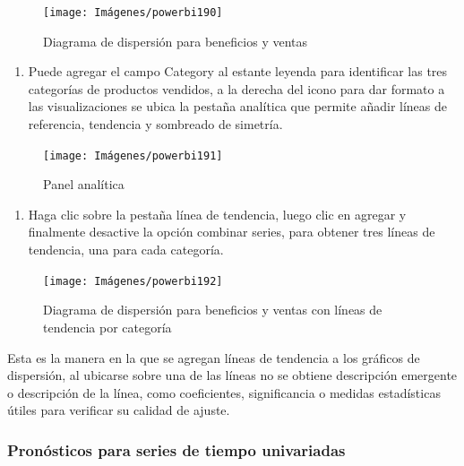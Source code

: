 \documentclass[
]{book}
\providecommand{\tightlist}{%
  \setlength{\itemsep}{0pt}\setlength{\parskip}{0pt}}
\begin{document}
\begin{figure}

{\centering \texttt{[image: Imágenes/powerbi190]} 

}

\caption{Diagrama de dispersión para beneficios y ventas}\label{fig:paso4dispersionpowerbi-fig}
\end{figure}

\begin{enumerate}
\def\labelenumi{\arabic{enumi}.}
\setcounter{enumi}{4}
\tightlist
\item
  Puede agregar el campo Category al estante leyenda para identificar las tres categorías de productos vendidos, a la derecha del icono para dar formato a las visualizaciones se ubica la pestaña analítica que permite añadir líneas de referencia, tendencia y sombreado de simetría.
\end{enumerate}

\begin{figure}

{\centering \texttt{[image: Imágenes/powerbi191]} 

}

\caption{Panel analítica}\label{fig:paso5dispersionpowerbi-fig}
\end{figure}

\begin{enumerate}
\def\labelenumi{\arabic{enumi}.}
\setcounter{enumi}{5}
\tightlist
\item
  Haga clic sobre la pestaña línea de tendencia, luego clic en agregar y finalmente desactive la opción combinar series, para obtener tres líneas de tendencia, una para cada categoría.
\end{enumerate}

\begin{figure}

{\centering \texttt{[image: Imágenes/powerbi192]} 

}

\caption{Diagrama de dispersión para beneficios y ventas con líneas de tendencia por categoría}\label{fig:paso6dispersionpowerbi-fig}
\end{figure}

Esta es la manera en la que se agregan líneas de tendencia a los gráficos de dispersión, al ubicarse sobre una de las líneas no se obtiene descripción emergente o descripción de la línea, como coeficientes, significancia o medidas estadísticas útiles para verificar su calidad de ajuste.

\hypertarget{pronuxf3sticos-para-series-de-tiempo-univariadas-1}{%
\subsubsection{Pronósticos para series de tiempo univariadas}\label{pronuxf3sticos-para-series-de-tiempo-univariadas-1}}
\end{document}
